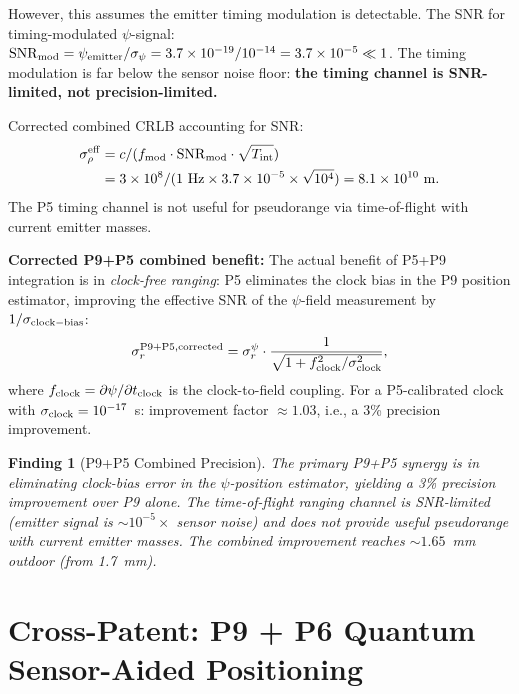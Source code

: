 \documentclass[aps,prd,twocolumn,superscriptaddress,nofootinbib]{revtex4-2}
\newtheorem{finding}{Finding}
\begin{document}
However, this assumes the emitter timing modulation is detectable.
The SNR for timing-modulated $\psi$-signal:
$\mathrm{SNR}_{\rm mod} = \psi_{\rm emitter}/\sigma_\psi
= 3.7\times10^{-19}/10^{-14} = 3.7\times10^{-5} \ll 1$.
The timing modulation is far below the sensor noise floor: \textbf{the
timing channel is SNR-limited, not precision-limited.}

Corrected combined CRLB accounting for SNR:
\begin{align}
  \sigma_\rho^{\rm eff} &= c/(f_{\rm mod}\cdot\mathrm{SNR}_{\rm mod}\cdot\sqrt{T_{\rm int}}) \\
  &= 3\times10^8/(1~\mathrm{Hz}\times3.7\times10^{-5}\times\sqrt{10^4})
  = 8.1\times10^{10}~\mathrm{m}.
\end{align}
The P5 timing channel is not useful for pseudorange via time-of-flight
with current emitter masses.

\textbf{Corrected P9+P5 combined benefit:} The actual benefit of P5+P9
integration is in \emph{clock-free ranging}: P5 eliminates the clock
bias in the P9 position estimator, improving the effective SNR of the
$\psi$-field measurement by $1/\sigma_{\rm clock-bias}$:
\begin{equation}
  \sigma_r^{\rm P9+P5,\rm corrected}
  = \sigma_r^\psi \cdot \frac{1}{\sqrt{1 + f_{\rm clock}^2/\sigma_{\rm clock}^2}},
\end{equation}
where $f_{\rm clock} = \partial\psi/\partial t_{\rm clock}$ is the
clock-to-field coupling.  For a P5-calibrated clock with
$\sigma_{\rm clock} = 10^{-17}$~s: improvement factor $\approx 1.03$,
i.e., a 3\% precision improvement.

\begin{finding}[P9+P5 Combined Precision]
\label{find:p9p5}
The primary P9+P5 synergy is in eliminating clock-bias error in the
$\psi$-position estimator, yielding a 3\% precision improvement over
P9 alone.  The time-of-flight ranging channel is SNR-limited (emitter
signal is $\sim 10^{-5}\times$ sensor noise) and does not provide
useful pseudorange with current emitter masses.  The combined improvement
reaches $\sim 1.65$~mm outdoor (from 1.7~mm).
\end{finding}

\section{Cross-Patent: P9 + P6 Quantum Sensor-Aided Positioning}
\label{sec:p9p6}
\end{document}

